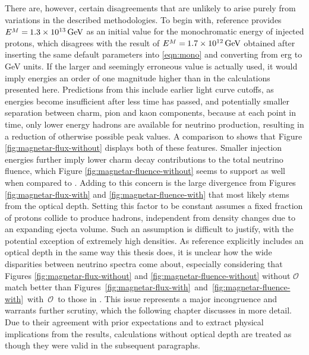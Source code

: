 There are, however, certain disagreements that are unlikely to arise purely from variations in the described methodologies. To begin with,
reference \cite{Carpio_2020} provides $\cramped{E^M} = \kern-0.5pt \smash{\qty{1.3e13}{\giga\electronvolt}}$ as an initial value for the
monochromatic energy of injected protons, which disagrees with the result of
$\cramped{E^M} = \kern-0.5pt \smash{\qty{1.7e12}{\giga\electronvolt}}$
obtained after inserting the same default parameters into \eqref{eqn:mono} and converting from \unit{erg} to \unit{\giga\electronvolt}
units. If the larger and seemingly erroneous value is actually used, it would imply energies an order of one magnitude higher than in the
calculations presented here. Predictions from this include earlier light curve cutoffs, as energies become insufficient after less time
has passed, and potentially smaller separation between charm, pion and kaon components, because at each point in time, only lower
energy hadrons are available for neutrino production, resulting in a reduction of otherwise possible peak values. A comparison to
\cite{Carpio_2020} shows that Figure \ref{fig:magnetar-flux-without} displays both of these features. Smaller injection energies
further imply lower charm decay contributions to the total neutrino fluence, which Figure \ref{fig:magnetar-fluence-without} seems
to support as well when compared to \cite{Carpio_2020}. Adding to this concern is the large divergence from Figures
\ref{fig:magnetar-flux-with} and \ref{fig:magnetar-fluence-with} that most likely stems from the optical depth. Setting this
factor to be constant assumes a fixed fraction of protons collide to produce hadrons, independent from density changes
due to an expanding ejecta volume. Such an assumption is difficult to justify, with the potential exception
of extremely high densities. As reference \cite{Carpio_2020} explicitly includes an optical depth in the same way
this thesis does, it is unclear how the wide disparities between neutrino spectra come about, especially
considering that Figures \ref{fig:magnetar-flux-without} and \ref{fig:magnetar-fluence-without} without $\mathscr{O}$ match
better than Figures~\ref{fig:magnetar-flux-with}~and~\ref{fig:magnetar-fluence-with}~with~$\mathscr{O}$~to those in \cite{Carpio_2020}.
This issue represents a major incongruence and warrants further scrutiny, which the following chapter discusses in more detail. Due to their
agreement with prior expectations and to extract physical implications from the results, calculations without optical depth are treated as
though they were valid in the subsequent paragraphs.

